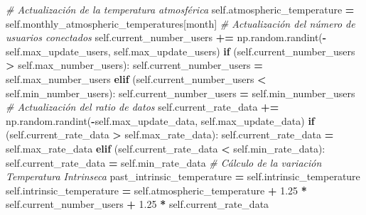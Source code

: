 \documentclass[]{book}
\newenvironment{Shaded}{\begin{snugshade}}{\end{snugshade}}
\newcommand{\CommentTok}[1]{\textcolor[rgb]{0.56,0.35,0.01}{\textit{#1}}}
\newcommand{\ControlFlowTok}[1]{\textcolor[rgb]{0.13,0.29,0.53}{\textbf{#1}}}
\newcommand{\FloatTok}[1]{\textcolor[rgb]{0.00,0.00,0.81}{#1}}
\newcommand{\NormalTok}[1]{#1}
\newcommand{\OperatorTok}[1]{\textcolor[rgb]{0.81,0.36,0.00}{\textbf{#1}}}
\newcommand{\VariableTok}[1]{\textcolor[rgb]{0.00,0.00,0.00}{#1}}
\begin{document}
\begin{Shaded}
\begin{Highlighting}[]
        \CommentTok{# Actualización de la temperatura atmosférica}
        \VariableTok{self}\NormalTok{.atmospheric_temperature }\OperatorTok{=} \VariableTok{self}\NormalTok{.monthly_atmospheric_temperatures[month]}
        \CommentTok{# Actualización del número de usuarios conectados}
        \VariableTok{self}\NormalTok{.current_number_users }\OperatorTok{+=}\NormalTok{ np.random.randint(}\OperatorTok{-}\VariableTok{self}\NormalTok{.max_update_users,}
                                                       \VariableTok{self}\NormalTok{.max_update_users)}
        \ControlFlowTok{if}\NormalTok{ (}\VariableTok{self}\NormalTok{.current_number_users }\OperatorTok{>} \VariableTok{self}\NormalTok{.max_number_users):}
            \VariableTok{self}\NormalTok{.current_number_users }\OperatorTok{=} \VariableTok{self}\NormalTok{.max_number_users}
        \ControlFlowTok{elif}\NormalTok{ (}\VariableTok{self}\NormalTok{.current_number_users }\OperatorTok{<} \VariableTok{self}\NormalTok{.min_number_users):}
            \VariableTok{self}\NormalTok{.current_number_users }\OperatorTok{=} \VariableTok{self}\NormalTok{.min_number_users}
        \CommentTok{# Actualización del ratio de datos}
        \VariableTok{self}\NormalTok{.current_rate_data }\OperatorTok{+=}\NormalTok{ np.random.randint(}\OperatorTok{-}\VariableTok{self}\NormalTok{.max_update_data,}
                                                    \VariableTok{self}\NormalTok{.max_update_data)}
        \ControlFlowTok{if}\NormalTok{ (}\VariableTok{self}\NormalTok{.current_rate_data }\OperatorTok{>} \VariableTok{self}\NormalTok{.max_rate_data):}
            \VariableTok{self}\NormalTok{.current_rate_data }\OperatorTok{=} \VariableTok{self}\NormalTok{.max_rate_data}
        \ControlFlowTok{elif}\NormalTok{ (}\VariableTok{self}\NormalTok{.current_rate_data }\OperatorTok{<} \VariableTok{self}\NormalTok{.min_rate_data):}
            \VariableTok{self}\NormalTok{.current_rate_data }\OperatorTok{=} \VariableTok{self}\NormalTok{.min_rate_data}
        \CommentTok{# Cálculo de la variación Temperatura Intrinseca}
\NormalTok{        past_intrinsic_temperature }\OperatorTok{=} \VariableTok{self}\NormalTok{.intrinsic_temperature}
        \VariableTok{self}\NormalTok{.intrinsic_temperature }\OperatorTok{=} \VariableTok{self}\NormalTok{.atmospheric_temperature}
                                     \OperatorTok{+} \FloatTok{1.25} \OperatorTok{*} \VariableTok{self}\NormalTok{.current_number_users}
                                     \OperatorTok{+} \FloatTok{1.25} \OperatorTok{*} \VariableTok{self}\NormalTok{.current_rate_data}

\end{Highlighting}
\end{Shaded}
\end{document}
